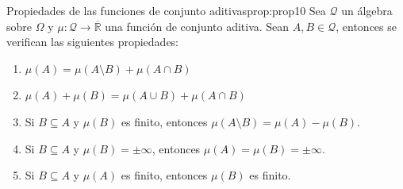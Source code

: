\newpage
\begin{proposicion}{Propiedades de las funciones de conjunto aditivas}{prop:prop10}
Sea $\mathcal{Q}$ un álgebra sobre $\Omega$ y $\mu : \mathcal{Q} \to \overline{\mathbb{R}}$ una función de conjunto aditiva. Sean $A, B \in \mathcal{Q}$, entonces se verifican las siguientes propiedades:
\begin{enumerate}[label=\arabic*.]
    \item $\mu(A) = \mu(A \setminus B) + \mu(A \cap B)$
    \item $\mu(A) + \mu(B) = \mu(A \cup B) + \mu(A \cap B)$
    \item Si $B \subseteq A$ y $\mu(B)$ es finito, entonces $\mu(A \setminus B) = \mu(A) - \mu(B)$.
    \item Si $B \subseteq A$ y $\mu(B) = \pm\infty$, entonces $\mu(A) = \mu(B) = \pm\infty$.
    \item Si $B \subseteq A$ y $\mu(A)$ es finito, entonces $\mu(B)$ es finito.
\end{enumerate}
\end{proposicion}
